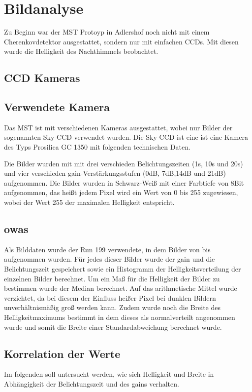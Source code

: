 \chapter{Bildanalyse}
Zu Beginn war der MST Protoyp in Adlershof noch nicht mit einem Cherenkovdetektor ausgestattet, sondern nur mit einfachen CCDs. Mit diesen wurde die Helligkeit des Nachthimmels beobachtet.

\section{CCD Kameras}

\section{Verwendete Kamera}
Das MST ist mit verschiedenen Kameras ausgestattet, wobei nur Bilder der sogenannten Sky-CCD verwendet wurden. Die Sky-CCD ist eine ist eine Kamera des Typs Prosilica GC 1350 mit folgenden technischen Daten.

Die Bilder wurden mit mit drei verschieden Belichtungszeiten (1s, 10s und 20s) und vier verschieden gain-Verstärkungsstufen (0dB, 7dB,14dB und 21dB) aufgenommen. Die Bilder wurden in Schwarz-Weiß mit einer Farbtiefe von 8Bit aufgenommen, das heißt jedem Pixel wird ein Wert von 0 bis 255 zugewiesen, wobei der Wert 255 der maximalen Helligkeit entspricht.

\section{owas}
Als Bilddaten wurde der Run 199 verwendete, in dem Bilder von bis aufgenommen wurden. Für jedes dieser Bilder wurde der gain und die Belichtungszeit gespeichert sowie ein Histogramm der Helligkeitsverteilung der einzelnen Bilder berechnet. Um ein Maß für die Helligkeit der Bilder zu bestimmen wurde der Median berechnet. Auf das arithmetische Mittel wurde verzichtet, da bei diesem der Einfluss heißer Pixel bei dunklen Bildern unverhältnismäßig groß werden kann. Zudem wurde noch die Breite des Helligkeitmaximums bestimmt in dem dieses als normalverteilt angenommen wurde und somit die Breite einer Standardabweichung berechnet wurde.

\section{Korrelation der Werte}
Im folgenden soll untersucht werden, wie sich Helligkeit und Breite in Abhängigkeit der Belichtungszeit und des gains verhalten.

